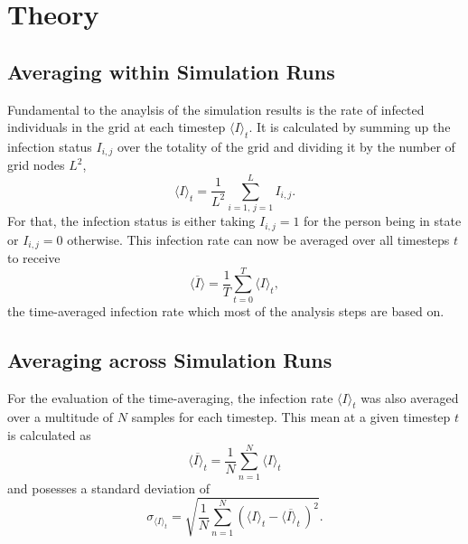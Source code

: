 \section{Theory}

\subsection{Averaging within Simulation Runs}

Fundamental to the anaylsis of the simulation results is the rate of infected individuals in the grid at each timestep $\langle I\rangle_t$. It is calculated by summing up the infection status $I_{i,j}$
over the totality of the grid and dividing it by the number of grid nodes $L^2$,
\begin{equation}
    \langle I\rangle_t=\frac{1}{L^2}\sum_{i=1,\,j=1}^{L}I_{i,j}.
    \label{eq:theo_inf_rate}
\end{equation}
For that, the infection status is either taking $I_{i,j}=1$ for the person being in state \infected{} or $I_{i,j}=0$ otherwise. This infection rate can now be averaged over all timesteps $t$ to receive
\begin{equation}
    \overline{\langle I\rangle}=\frac{1}{T}\sum_{t=0}^{T}\langle I\rangle_t,
    \label{eq:theo_time_avg_inf_rate}
\end{equation}
the time-averaged infection rate which most of the analysis steps are based on.

\subsection{Averaging across Simulation Runs}

For the evaluation of the time-averaging, the infection rate $\langle I\rangle_t$ was also averaged over a multitude of $N$ samples for each timestep. This mean at a given timestep $t$ is calculated as
\begin{equation}
    \overline{\langle I\rangle_t}=\frac{1}{N}\sum_{n=1}^{N}\langle I\rangle_t
    \label{eq:theo_mean_inf_rate}
\end{equation}
and posesses a standard deviation of
\begin{equation}
    \sigma_{\langle I\rangle_t}=\sqrt{\frac{1}{N}\sum_{n=1}^{N}\left(\langle I\rangle_t-\overline{\langle I\rangle_t}\,\right)^2}.
    \label{eq:theo_sigma_inf_rate}
\end{equation}